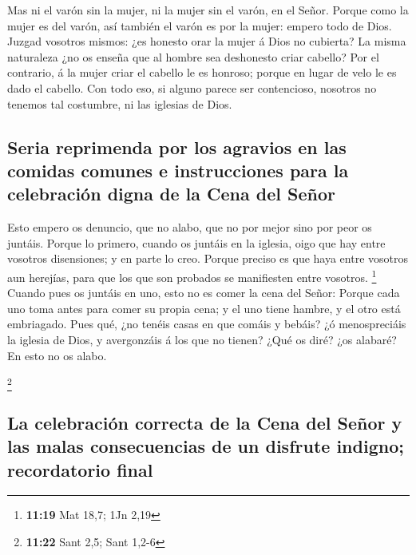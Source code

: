  Mas ni el varón sin la mujer, ni la mujer sin el varón,
en el Señor.  Porque como la mujer es del varón, así
también el varón es por la mujer: empero todo de Dios. 
Juzgad vosotros mismos: ¿es honesto orar la mujer á Dios no cubierta?
 La misma naturaleza ¿no os enseña que al hombre sea
deshonesto criar cabello?  Por el contrario, á la mujer
criar el cabello le es honroso; porque en lugar de velo le es dado el
cabello.  Con todo eso, si alguno parece ser contencioso,
nosotros no tenemos tal costumbre, ni las iglesias de Dios.

\hypertarget{seria-reprimenda-por-los-agravios-en-las-comidas-comunes-e-instrucciones-para-la-celebraciuxf3n-digna-de-la-cena-del-seuxf1or}{%
\subsection{Seria reprimenda por los agravios en las comidas comunes e
instrucciones para la celebración digna de la Cena del
Señor}\label{seria-reprimenda-por-los-agravios-en-las-comidas-comunes-e-instrucciones-para-la-celebraciuxf3n-digna-de-la-cena-del-seuxf1or}}

 Esto empero os denuncio, que no alabo, que no por mejor
sino por peor os juntáis.  Porque lo primero, cuando os
juntáis en la iglesia, oigo que hay entre vosotros disensiones; y en
parte lo creo.  Porque preciso es que haya entre vosotros
aun herejías, para que los que son probados se manifiesten entre
vosotros. \footnote{\textbf{11:19} Mat 18,7; 1Jn 2,19} 
Cuando pues os juntáis en uno, esto no es comer la cena del Señor:
 Porque cada uno toma antes para comer su propia cena; y
el uno tiene hambre, y el otro está embriagado.  Pues
qué, ¿no tenéis casas en que comáis y bebáis? ¿ó menospreciáis la
iglesia de Dios, y avergonzáis á los que no tienen? ¿Qué os diré? ¿os
alabaré? En esto no os alabo.

\footnote{\textbf{11:22} Sant 2,5; Sant 1,2-6}

\hypertarget{la-celebraciuxf3n-correcta-de-la-cena-del-seuxf1or-y-las-malas-consecuencias-de-un-disfrute-indigno-recordatorio-final}{%
\subsection{La celebración correcta de la Cena del Señor y las malas
consecuencias de un disfrute indigno; recordatorio
final}\label{la-celebraciuxf3n-correcta-de-la-cena-del-seuxf1or-y-las-malas-consecuencias-de-un-disfrute-indigno-recordatorio-final}}

